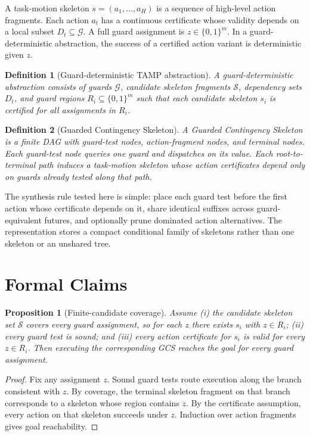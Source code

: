 \documentclass{article}
\newtheorem{proposition}{Proposition}
\newtheorem{definition}{Definition}
\newcommand{\guards}{\mathcal{G}}
\newcommand{\skels}{\mathcal{S}}
\begin{document}
A task-motion skeleton $s=(a_1,\ldots,a_H)$ is a sequence of high-level action fragments. Each action $a_t$ has a continuous certificate whose validity depends on a local subset $D_t\subseteq\guards$. A full guard assignment is $z\in\{0,1\}^m$. In a guard-deterministic abstraction, the success of a certified action variant is deterministic given $z$.

\begin{definition}[Guard-deterministic TAMP abstraction]
A guard-deterministic abstraction consists of guards $\guards$, candidate skeleton fragments $\skels$, dependency sets $D_t$, and guard regions $R_i\subseteq\{0,1\}^m$ such that each candidate skeleton $s_i$ is certified for all assignments in $R_i$.
\end{definition}

\begin{definition}[Guarded Contingency Skeleton]
A Guarded Contingency Skeleton is a finite DAG with guard-test nodes, action-fragment nodes, and terminal nodes. Each guard-test node queries one guard and dispatches on its value. Each root-to-terminal path induces a task-motion skeleton whose action certificates depend only on guards already tested along that path.
\end{definition}

The synthesis rule tested here is simple: place each guard test before the first action whose certificate depends on it, share identical suffixes across guard-equivalent futures, and optionally prune dominated action alternatives. The representation stores a compact conditional family of skeletons rather than one skeleton or an unshared tree.

\section{Formal Claims}
\begin{proposition}[Finite-candidate coverage]
Assume (i) the candidate skeleton set $\skels$ covers every guard assignment, so for each $z$ there exists $s_i$ with $z\in R_i$; (ii) every guard test is sound; and (iii) every action certificate for $s_i$ is valid for every $z\in R_i$. Then executing the corresponding GCS reaches the goal for every guard assignment.
\end{proposition}

\begin{proof}
Fix any assignment $z$. Sound guard tests route execution along the branch consistent with $z$. By coverage, the terminal skeleton fragment on that branch corresponds to a skeleton whose region contains $z$. By the certificate assumption, every action on that skeleton succeeds under $z$. Induction over action fragments gives goal reachability.
\end{proof}
\end{document}
